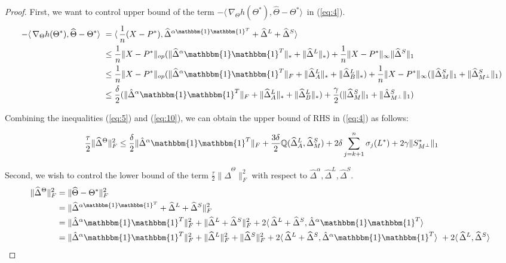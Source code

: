 \documentclass[AMS,STIX1COL]{WileyNJD-v2}
\begin{document}
\begin{proof}
First, we want to control upper bound of the term $-\langle\,\nabla_{\Theta}h(\Theta^{*}),\widehat{\Theta}-\Theta^{*} \rangle\,$
in (\ref{eq:4}).
\begin{align}
-\langle\,\nabla_{\Theta}h(\Theta^{*}),\widehat{\Theta}-\Theta^{*} \rangle\  \nonumber
&=\langle\, \frac{1}{n} (X - P^*), \widehat\Delta^{\alpha\mathbbm{1}\mathbbm{1}^T} + \widehat\Delta^{L} + \widehat\Delta^{S} \rangle\ \\ \nonumber
&\leq \frac{1}{n} \|X - P^*\|_{op}(\|\widehat{\Delta}^{\alpha}\mathbbm{1}\mathbbm{1}^T\|_\ast + \|\widehat{\Delta}^{L}\|_\ast) +  \frac{1}{n} \|X - P^*\|_{\infty}\|\widehat{\Delta}^{S}\|_{1} \\ \nonumber
&\leq \frac{1}{n} \|X - P^*\|_{op}(\|\widehat{\Delta}^{\alpha}\mathbbm{1}\mathbbm{1}^T\|_{F} + \|\widehat{\Delta}^{L}_{A}\|_\ast + \|\widehat{\Delta}^{L}_{B}\|_\ast) +
\frac{1}{n} \|X - P^*\|_{\infty}(\|\widehat{\Delta}^{S}_{M}\|_{1} + 
\|\widehat{\Delta}^{S}_{M^{\perp}}\|_{1}) \\ 
&\leq \frac{\delta}{2}(\|\hat{\Delta}^{\alpha}\mathbbm{1}\mathbbm{1}^T\|_{F} + \|\widehat{\Delta}^{L}_{A}\|_\ast + \|\widehat{\Delta}^{L}_{B}\|_\ast) + \frac{\gamma}{2}(\|\widehat{\Delta}^{S}_{M}\|_{1} + 
\|\hat{\Delta}^{S}_{M^{\perp}}\|_{1})  \label{eq:10}
\end{align}

Combining the inequalities (\ref{eq:5}) and (\ref{eq:10}), we can obtain the upper bound of RHS in (\ref{eq:4}) as follows:

\begin{equation}
    \frac{\tau}{2}\|\widehat{\Delta}^{\Theta}\|_{F}^{2} \leq
    \frac{\delta}{2}\|\hat{\Delta}^{\alpha}\mathbbm{1}\mathbbm{1}^T\|_{F} + 
    \frac{3\delta}{2}\mathbb{Q}(\widehat{\Delta}^L_{A},\widehat{\Delta}^S_{M})
    +2 \delta \sum_{j=k+1}^{n} \sigma_{j}(L^*) + 2\gamma \|S^*_{M^\perp}\|_{1}
    \label{eq:11}
\end{equation}

Second, we wish to control the lower bound of the term  $\frac{\tau}{2}\|\hat{\Delta}^{\Theta}\|_{F}^{2}$ with respect to $\hat{\Delta}^{\alpha},\hat{\Delta}^{L},\hat{\Delta}^{S}$.
\begin{align}
\|\widehat{\Delta}^{\Theta}\|_{F}^{2}  \nonumber
&= \|\widehat{\Theta}-\Theta^{*} \|_{F}^{2} \\ \nonumber
&= \|\widehat\Delta^{\alpha\mathbbm{1}\mathbbm{1}^T} + \widehat\Delta^{L} + \widehat\Delta^{S}\|_{F}^{2} \\ \nonumber
&= \|\hat{\Delta}^{\alpha}\mathbbm{1}\mathbbm{1}^T\|_{F}^{2} + \|\widehat{\Delta}^{L}+\widehat{\Delta}^{S}\|_{F}^{2} + 
2 \langle\, \widehat\Delta^{L} + \widehat\Delta^{S} ,\hat{\Delta}^{\alpha}\mathbbm{1}\mathbbm{1}^T \rangle\ \\ 
&=  \|\hat{\Delta}^{\alpha}\mathbbm{1}\mathbbm{1}^T\|_{F}^{2} + \|\widehat{\Delta}^{L}\|_{F}^{2} + \|\widehat{\Delta}^{S}\|_{F}^{2} + 
2 \langle\, \widehat\Delta^{L} + \widehat\Delta^{S} ,\hat{\Delta}^{\alpha}\mathbbm{1}\mathbbm{1}^T \rangle\ +
2 \langle\, \widehat\Delta^{L}, \widehat\Delta^{S} \rangle\  \label{eq:12}
\end{align}


\end{proof}
\end{document}
